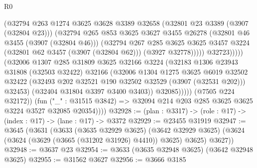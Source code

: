 \begin{lexlean}{R0}
\begin{coremodule}
                                (@32794
                                  @263
                                  @1274
                                  @3625
                                  @3628
                                  @3389
                                  @32658
                                  (@32801 @23 @3389 (@3907 (@32804 @23)))
                                  (@32794
                                    @265
                                    @853
                                    @3625
                                    @3627
                                    @3455
                                    @26278
                                    (@32801 @46 @3455 (@3907 (@32804 @46)))
                                    (@32794
                                      @267
                                      @285
                                      @3625
                                      @3625
                                      @3457
                                      @3224
                                      (@32801 @62 @3457 (@3907 (@32804 @62)))
                                      (@3927 @32778)))))
                              @32723)))))
                    (@32006
                      @1307
                      @285
                      @31809
                      @3625
                      @32166
                      @3224
                      (@32183
                        @1306
                        @23943
                        @31808
                        (@32503 @32422)
                        @32166
                        (@32006
                          @1304
                          @1275
                          @3625
                          @6019
                          @32502
                          @32422
                          (@32493 @202 @32521 @190 @32502 @32529 (@3907 (@32531 @202)))
                          @32453)
                        (@32404 @31804 @3397 @3400 @3403))
                      @32085)))))
            (@7505 @224 @32172))
          (fun ("_" : @31515 @3842) =>
          @32094 @214 @203 @285 @3625 @3625 @3224 @3527 @32085 @20354))))
@32928 := (plan : @3317) -> (role : @17) -> (index : @17) -> (lane : @17) -> @3372
@32929 := @23455 @31919
@32947 := @3645
    (@3631
      (@3633
        (@3635 @32929 @3625)
        (@3642 @32929 @3625)
        (@3624 (@3624 (@3629 (@3665 (@31202 @31926) @4410)) @3625) @3625)
        @3627))
@32948 := @3637 @23
@32954 := @3633 (@3635 @32948 @3625) (@3642 @32948 @3625)
@32955 := @31562 @3627
@32956 := @3666 @3185

\end{coremodule}
\end{lexlean}
